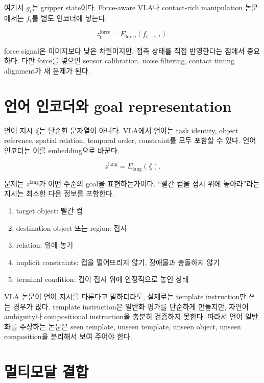 여기서 $g_t$는 gripper state이다. Force-aware VLA나 contact-rich manipulation 논문에서는 $f_t$를 별도 인코더에 넣는다.

\begin{equation}
  z_t^{\mathrm{force}} = E_{\mathrm{force}}(f_{t-r:t}).
\end{equation}

force signal은 이미지보다 낮은 차원이지만, 접촉 상태를 직접 반영한다는 점에서 중요하다. 다만 force를 넣으면 sensor calibration, noise filtering, contact timing alignment가 새 문제가 된다.

\section{언어 인코더와 goal representation}

언어 지시 $\lang$는 단순한 문자열이 아니다. VLA에서 언어는 task identity, object reference, spatial relation, temporal order, constraint를 모두 포함할 수 있다. 언어 인코더는 이를 embedding으로 바꾼다.

\begin{equation}
  z^{\mathrm{lang}} = E_{\mathrm{lang}}(\lang).
\end{equation}

문제는 $z^{\mathrm{lang}}$가 어떤 수준의 goal을 표현하는가이다. ``빨간 컵을 접시 위에 놓아라''라는 지시는 최소한 다음 정보를 포함한다.

\begin{enumerate}
  \item target object: 빨간 컵
  \item destination object 또는 region: 접시
  \item relation: 위에 놓기
  \item implicit constraints: 컵을 떨어뜨리지 않기, 장애물과 충돌하지 않기
  \item terminal condition: 컵이 접시 위에 안정적으로 놓인 상태
\end{enumerate}

VLA 논문이 언어 지시를 다룬다고 말하더라도, 실제로는 template instruction만 쓰는 경우가 많다. template instruction은 일반화 평가를 단순하게 만들지만, 자연어 ambiguity나 compositional instruction을 충분히 검증하지 못한다. 따라서 언어 일반화를 주장하는 논문은 seen template, unseen template, unseen object, unseen composition을 분리해서 보여 주어야 한다.

\section{멀티모달 결합}

